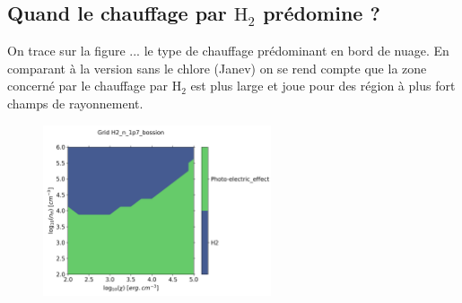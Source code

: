 \subsection{Quand le chauffage par $\mathrm{H}_2$ prédomine ?}

On trace sur la figure ... le type de chauffage prédominant en bord de nuage. En comparant à la version \uncinq sans le chlore (Janev) on se rend compte que la zone concerné par le chauffage par $\mathrm{H}_2$ est plus large et joue pour des région à plus fort champs de rayonnement. \newline

\begin{figure}[h!]
    \centering
    \includegraphics[width = 0.6\textwidth]{figure/H2/mapGloverBossion/mapGmax.png}
    \caption{}
    \label{fig:H2:mapGloverBossion:Gmax}
\end{figure}

